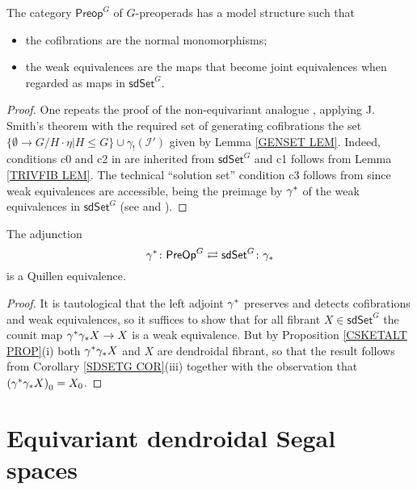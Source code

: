 \documentclass[a4paper,10pt
,draft
]{article}%
\begin{document}
\begin{theorem}\label{PREOPMOD THM}
	The category $\mathsf{Preop}^G$ of $G$-preoperads has a model structure such that
	\begin{itemize}
		\item the cofibrations are the normal monomorphisms;
		\item the weak equivalences are the maps 
		that become joint equivalences when regarded as maps in 
		$\mathsf{sdSet}^G$.
	\end{itemize}
\end{theorem}

\begin{proof}
One repeats the proof of the non-equivariant analogue \cite[Thm. 8.13]{CM13a}, applying J. Smith's theorem \cite[Thm. 1.7]{Bek00} with the required set of generating cofibrations the 
set $\{\emptyset \to G/H\cdot \eta | H \leq G\} \cup \gamma_! (\mathcal{I}')$ given by Lemma \ref{GENSET LEM}.
Indeed, conditions c0 and c2 in \cite{Bek00} are inherited from 
$\mathsf{sdSet}^G$ and c1 follows from Lemma \ref{TRIVFIB LEM}.
The technical ``solution set'' condition c3 follows from 
\cite[Prop. 1.15]{Bek00} since weak equivalences are accessible, being the preimage by $\gamma^{\**}$ of the weak equivalences in 
$\mathsf{sdSet}^G$ 
(see \cite[Cor. A.2.6.5]{Lur09} and \cite[Cor. A.2.6.6]{Lur09}). 
\end{proof}


\begin{theorem}\label{ANOQUEQUIV THM}
The adjunction
\[
	\gamma^{\**} \colon \mathsf{PreOp}^G	
\rightleftarrows
	\mathsf{sdSet}^G \colon \gamma_{\**}
\]
is a Quillen equivalence.
\end{theorem}

\begin{proof}
	It is tautological that the left adjoint $\gamma^{\**}$
	preserves and detects cofibrations and weak equivalences,
	so it suffices to show that for all fibrant
	$X \in \mathsf{sdSet}^G$
	the counit map 
	$\gamma^{\**} \gamma_{\**} X \to X$
	is a weak equivalence. 
	But by
	Proposition \ref{CSKETALT PROP}(i) both
	$\gamma^{\**} \gamma_{\**} X$ and $X$
	are dendroidal fibrant, 
	so that the result follows from 
	Corollary \ref{SDSETG COR}(iii) together with the observation that $\left(\gamma^{\**} \gamma_{\**} X\right)_0 = X_0$.
\end{proof}



\section{Equivariant dendroidal Segal spaces}
\label{EDSS_SEC}
\end{document}
